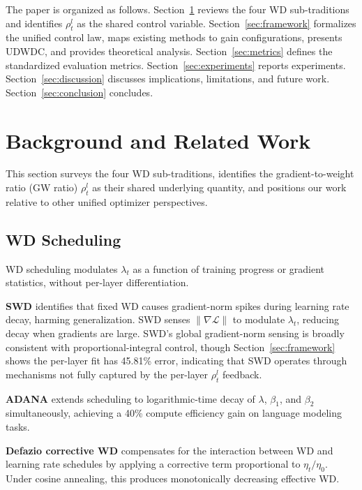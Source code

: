 \documentclass{article}
\begin{document}
The paper is organized as follows. Section~\ref{sec:background} reviews the four WD sub-traditions and identifies $\rho_t^l$ as the shared control variable. Section~\ref{sec:framework} formalizes the unified control law, maps existing methods to gain configurations, presents UDWDC, and provides theoretical analysis. Section~\ref{sec:metrics} defines the standardized evaluation metrics. Section~\ref{sec:experiments} reports experiments. Section~\ref{sec:discussion} discusses implications, limitations, and future work. Section~\ref{sec:conclusion} concludes.

\section{Background and Related Work}
\label{sec:background}

This section surveys the four WD sub-traditions, identifies the gradient-to-weight ratio (GW ratio) $\rho_t^l$ as their shared underlying quantity, and positions our work relative to other unified optimizer perspectives.

\subsection{WD Scheduling}

WD scheduling modulates $\lambda_t$ as a function of training progress or gradient statistics, without per-layer differentiation.

\textbf{SWD} \citep{xie2023swd} identifies that fixed WD causes gradient-norm spikes during learning rate decay, harming generalization. SWD senses $\|\nabla \mathcal{L}\|$ to modulate $\lambda_t$, reducing decay when gradients are large. SWD's global gradient-norm sensing is broadly consistent with proportional-integral control, though Section~\ref{sec:framework} shows the per-layer fit has 45.81\% error, indicating that SWD operates through mechanisms not fully captured by the per-layer $\rho_t^l$ feedback.

\textbf{ADANA} \citep{ferbach2026adana} extends scheduling to logarithmic-time decay of $\lambda$, $\beta_1$, and $\beta_2$ simultaneously, achieving a 40\% compute efficiency gain on language modeling tasks.

\textbf{Defazio corrective WD} \citep{defazio2025gw} compensates for the interaction between WD and learning rate schedules by applying a corrective term proportional to $\eta_t / \eta_0$. Under cosine annealing, this produces monotonically decreasing effective WD.
\end{document}
